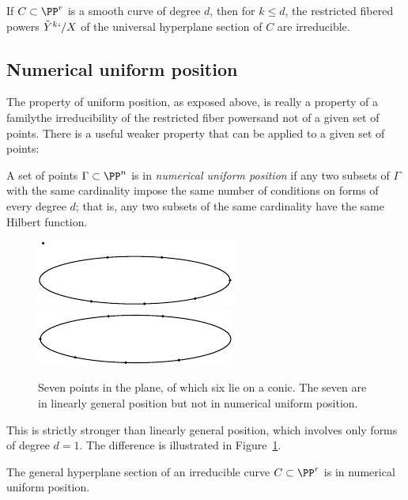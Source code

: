 \begin{corollary}\label{hyperplane section monodromy} If $C\subset \PP^r$
is a smooth curve of degree $d$, then
for $k\leq d$, the restricted fibered powers $\tilde Y^k`/X$  of the
universal hyperplane section
of $C$ are irreducible.
\end{corollary}

\subsection*{Numerical uniform position}

The property of uniform position, as exposed above, is really a property
of a family\emdash the irreducibility of the restricted
fiber powers\emdash and not of a given set of points. There is a useful
weaker property that
can be applied to a given set of points:

\begin{definition}
 A set of points $\Gamma\subset \PP^n$ is in \emph{numerical uniform
 position} if
 any two subsets of $\Gamma$ with the same cardinality impose the same
 number of conditions on forms of every degree $d$; that is, any two subsets
 of the same cardinality have the same Hilbert function.
%
\begin{figure}
\leavevmode
\vbox{\offinterlineskip
\hbox{\includegraphics[scale=1.3,viewport=-10 37 118 39,clip]{main/Fig10-2}}%
\hbox{\includegraphics[scale=1.3,viewport=0 0 118 33,clip]{main/Fig10-2a}}}
\caption{
Seven
points in the plane,
of which six lie
on a conic. The seven are in linearly general
position
but not
in numerical
uniform position.}
\label{numerical uniform is stronger}
\end{figure}
%

This is strictly stronger than linearly general position, which
involves only forms of degree $d=1$. The difference is illustrated
in Figure~\ref{numerical uniform is stronger}.
\end{definition}

\begin{corollary}\label{numerical
uniform position lemma}
The general hyperplane section of an irreducible curve
%
$C\subset \PP^r$ is in numerical uniform position.
\unif
\end{corollary}

